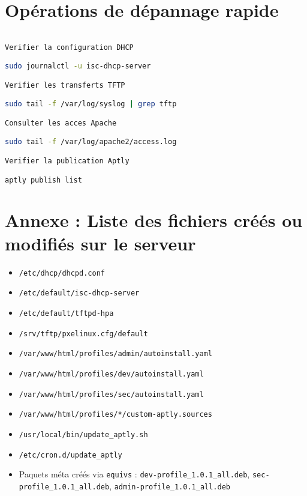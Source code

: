 \documentclass[a4paper,12pt]{article}
\begin{document}
\section{Opérations de dépannage rapide}
\begin{lstlisting}[language=bash]

Verifier la configuration DHCP

sudo journalctl -u isc-dhcp-server

Verifier les transferts TFTP

sudo tail -f /var/log/syslog | grep tftp

Consulter les acces Apache

sudo tail -f /var/log/apache2/access.log

Verifier la publication Aptly

aptly publish list
\end{lstlisting}
\section{Annexe : Liste des fichiers créés ou modifiés sur le serveur}
\begin{itemize}
\item \texttt{/etc/dhcp/dhcpd.conf}
\item \texttt{/etc/default/isc-dhcp-server}
\item \texttt{/etc/default/tftpd-hpa}
\item \texttt{/srv/tftp/pxelinux.cfg/default}
\item \texttt{/var/www/html/profiles/admin/autoinstall.yaml}
\item \texttt{/var/www/html/profiles/dev/autoinstall.yaml}
\item \texttt{/var/www/html/profiles/sec/autoinstall.yaml}
\item \texttt{/var/www/html/profiles/*/custom-aptly.sources}
\item \texttt{/usr/local/bin/update\_aptly.sh}
\item \texttt{/etc/cron.d/update\_aptly}
\item Paquets méta créés via \texttt{equivs} : \texttt{dev-profile\_1.0.1\_all.deb}, \texttt{sec-profile\_1.0.1\_all.deb}, \texttt{admin-profile\_1.0.1\_all.deb}
\end{itemize}
\end{document}
